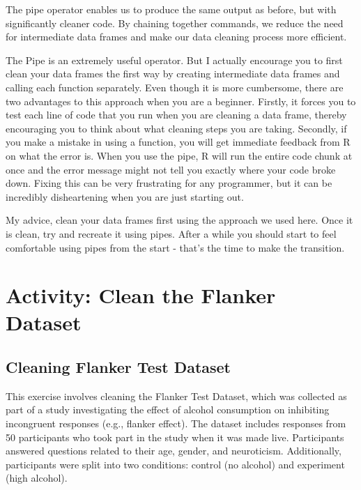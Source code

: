\documentclass[
]{book}
\begin{document}
The pipe operator enables us to produce the same output as before, but with significantly cleaner code. By chaining together commands, we reduce the need for intermediate data frames and make our data cleaning process more efficient.

The Pipe is an extremely useful operator. But I actually encourage you to first clean your data frames the first way by creating intermediate data frames and calling each function separately. Even though it is more cumbersome, there are two advantages to this approach when you are a beginner. Firstly, it forces you to test each line of code that you run when you are cleaning a data frame, thereby encouraging you to think about what cleaning steps you are taking. Secondly, if you make a mistake in using a function, you will get immediate feedback from R on what the error is. When you use the pipe, R will run the entire code chunk at once and the error message might not tell you exactly where your code broke down. Fixing this can be very frustrating for any programmer, but it can be incredibly disheartening when you are just starting out.

My advice, clean your data frames first using the approach we used here. Once it is clean, try and recreate it using pipes. After a while you should start to feel comfortable using pipes from the start - that's the time to make the transition.

\hypertarget{activity-clean-the-flanker-dataset}{%
\section{Activity: Clean the Flanker Dataset}\label{activity-clean-the-flanker-dataset}}

\hypertarget{cleaning-flanker-test-dataset}{%
\subsection{\texorpdfstring{\textbf{Cleaning Flanker Test Dataset}}{Cleaning Flanker Test Dataset}}\label{cleaning-flanker-test-dataset}}

This exercise involves cleaning the Flanker Test Dataset, which was collected as part of a study investigating the effect of alcohol consumption on inhibiting incongruent responses (e.g., flanker effect). The dataset includes responses from 50 participants who took part in the study when it was made live. Participants answered questions related to their age, gender, and neuroticism. Additionally, participants were split into two conditions: control (no alcohol) and experiment (high alcohol).
\end{document}

